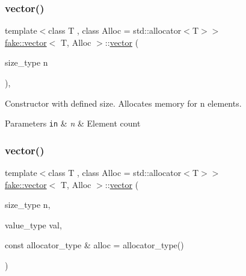 \subsubsection{\texorpdfstring{vector()}{vector()}\hspace{0.1cm}{\footnotesize\ttfamily [2/9]}}
{\footnotesize\ttfamily template$<$class T , class Alloc  = std\+::allocator$<$\+T$>$$>$ \\
\mbox{\hyperlink{classfake_1_1vector}{fake\+::vector}}$<$ T, Alloc $>$\+::\mbox{\hyperlink{classfake_1_1vector}{vector}} (\begin{DoxyParamCaption}\item[{size\+\_\+type}]{n }\end{DoxyParamCaption})\hspace{0.3cm}{\ttfamily [inline]}, {\ttfamily [explicit]}}



Constructor with defined size. Allocates memory for n elements. 


\begin{DoxyParams}[1]{Parameters}
\mbox{\tt in}  & {\em n} & Element count \\
\hline
\end{DoxyParams}
\mbox{\label{classfake_1_1vector_a5660b1ba62f11951f93eb603741c08a3}} 
\subsubsection{\texorpdfstring{vector()}{vector()}\hspace{0.1cm}{\footnotesize\ttfamily [3/9]}}
{\footnotesize\ttfamily template$<$class T , class Alloc  = std\+::allocator$<$\+T$>$$>$ \\
\mbox{\hyperlink{classfake_1_1vector}{fake\+::vector}}$<$ T, Alloc $>$\+::\mbox{\hyperlink{classfake_1_1vector}{vector}} (\begin{DoxyParamCaption}\item[{size\+\_\+type}]{n,  }\item[{value\+\_\+type}]{val,  }\item[{const allocator\+\_\+type \&}]{alloc = {\ttfamily allocator\+\_\+type()} }\end{DoxyParamCaption})\hspace{0.3cm}{\ttfamily [inline]}}



